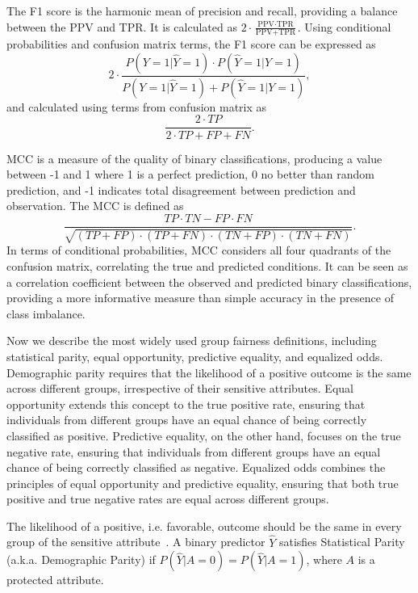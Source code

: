 \begin{definition}[F1 Score]\label{def:f1}
The F1 score is the harmonic mean of precision and recall, providing a balance between the PPV and TPR. It is calculated as $2 \cdot \frac{\text{PPV} \cdot \text{TPR}}{\text{PPV} + \text{TPR}}$. Using conditional probabilities and confusion matrix terms, the F1 score can be expressed as $$2 \cdot \frac{P(Y=1|\hat{Y}=1) \cdot P(\hat{Y}=1|Y=1)}{P(Y=1|\hat{Y}=1) + P(\hat{Y}=1|Y=1)},$$ and calculated using terms from confusion matrix as $$\frac{2 \cdot TP}{2 \cdot TP + FP + FN}.$$
\end{definition}

\begin{definition}\label{def:mcc}
MCC is a measure of the quality of binary classifications, producing a value between -1 and 1 where 1 is a perfect prediction, 0 no better than random prediction, and -1 indicates total disagreement between prediction and observation. The MCC is defined as $$\frac{TP \cdot TN - FP \cdot FN}{\sqrt{(TP+FP) \cdot (TP+FN) \cdot (TN+FP) \cdot (TN+FN)}}.$$ In terms of conditional probabilities, MCC considers all four quadrants of the confusion matrix, correlating the true and predicted conditions. It can be seen as a correlation coefficient between the observed and predicted binary classifications, providing a more informative measure than simple accuracy in the presence of class imbalance.
\end{definition}
    
Now we describe the most widely used group fairness definitions, including statistical parity, equal opportunity, predictive equality, and equalized odds. Demographic parity requires that the likelihood of a positive outcome is the same across different groups, irrespective of their sensitive attributes. Equal opportunity extends this concept to the true positive rate, ensuring that individuals from different groups have an equal chance of being correctly classified as positive. Predictive equality, on the other hand, focuses on the true negative rate, ensuring that individuals from different groups have an equal chance of being correctly classified as negative. Equalized odds combines the principles of equal opportunity and predictive equality, ensuring that both true positive and true negative rates are equal across different groups.

\begin{definition}\label{def:demo_parity}
The likelihood of a positive, i.e. favorable, outcome should be the same in every group of the sensitive attribute~\citep{Dwork2011,Kusner2018}. A binary predictor $\hat{Y}$ satisfies Statistical Parity (a.k.a. Demographic Parity) if $P(\hat{Y}|A=0) = P(\hat{Y}|A=1)$, where $A$ is a protected attribute.
\end{definition}

